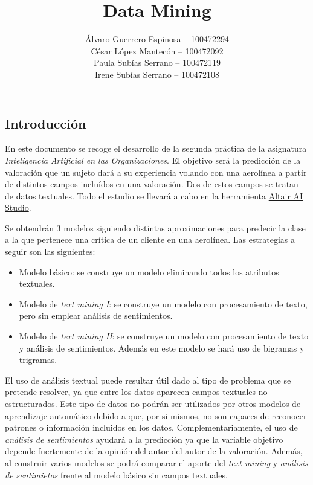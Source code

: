 \documentclass[es]{uc3mreport}
\author{
    Álvaro Guerrero Espinosa -- 100472294 \\
    César López Mantecón -- 100472092 \\
    Paula Subías Serrano -- 100472119 \\
    Irene Subías Serrano -- 100472108
}
\title{Data Mining}
\begin{document}
  \makecover[new]

  \tableofcontents
  \listoffigures
  \listoftables

  \begin{report}

\section{Introducción}
\label{chap:intro}
En este documento se recoge el desarrollo de la segunda práctica de la asignatura \textit{Inteligencia Artificial en las Organizaciones}. El objetivo será la predicción de la valoración que un sujeto dará a su experiencia volando con una aerolínea a partir de distintos campos incluídos en una valoración. Dos de estos campos se tratan de datos textuales. Todo el estudio se llevará a cabo en la herramienta \href{https://altair.com/altair-ai-studio}{Altair AI Studio}.

Se obtendrán 3 modelos siguiendo distintas aproximaciones para predecir la clase a la que pertenece una crítica de un cliente en una aerolínea. Las estrategias a seguir son las siguientes:

\begin{itemize}
    \item Modelo básico: se construye un modelo eliminando todos los atributos textuales.
    \item Modelo de \textit{text mining I}: se construye un modelo con procesamiento de texto, pero sin emplear análisis de sentimientos.
    \item Modelo de \textit{text mining II}: se construye un modelo con procesamiento de texto y análisis de sentimientos. Además en este modelo se hará uso de bigramas y trigramas.
\end{itemize}

El uso de análisis textual puede resultar útil dado al tipo de problema que se pretende resolver, ya que entre los datos aparecen campos textuales no estructurados. Este tipo de datos no podrán ser utilizados por otros modelos de aprendizaje automático debido a que, por si mismos, no son capaces de reconocer patrones o información incluidos en los datos. Complementariamente, el uso de \textit{análisis de sentimientos} ayudará a la predicción ya que la variable objetivo depende fuertemente de la opinión del autor del autor de la valoración. Además, al construir varios modelos se podrá comparar el aporte del \textit{text mining} y \textit{análisis de sentimietos} frente al modelo básico sin campos textuales.


\end{report}
\end{document}
